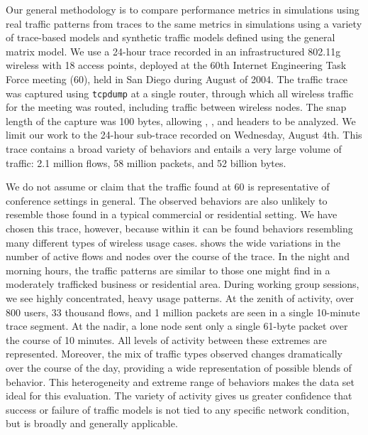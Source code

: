 \documentclass[twocolumn,final]{svjour3}
\begin{document}
Our general methodology is to compare performance metrics in simulations using real traffic patterns from traces to the same metrics in simulations using a variety of trace-based models and synthetic traffic models defined using the general matrix model. We use a 24-hour trace recorded in an infrastructured 802.11g wireless  with 18 access points, deployed at the 60th Internet Engineering Task Force meeting (60), held in San Diego during August of 2004. The traffic trace was captured using \texttt{\small{tcpdump}} at a single router, through which all wireless traffic for the meeting was routed, including traffic between wireless nodes. The snap length of the capture was 100 bytes, allowing , ,  and  headers to be analyzed. We limit our work to the 24-hour sub-trace recorded on Wednesday, August 4th. This trace contains a broad variety of behaviors and entails a very large volume of traffic: 2.1 million flows, 58 million packets, and 52 billion bytes.



We do not assume or claim that the traffic found at 60 is representative of conference settings in general. The observed behaviors are also unlikely to resemble those found in a typical commercial or residential setting. We have chosen this trace, however, because within it can be found behaviors resembling many different types of wireless usage cases.  shows the wide variations in the number of active flows and nodes over the course of the trace. In the night and morning hours, the traffic patterns are similar to those one might find in a moderately trafficked business or residential area. During working group sessions, we see highly concentrated, heavy usage patterns. At the zenith of activity, over 800 users, 33 thousand flows, and 1 million packets are seen in a single 10-minute trace segment. At the nadir, a lone node sent only a single 61-byte packet over the course of 10 minutes. All levels of activity between these extremes are represented. Moreover, the mix of traffic types observed changes dramatically over the course of the day, providing a wide representation of possible blends of behavior. This heterogeneity and extreme range of behaviors makes the  data set ideal for this evaluation. The variety of activity gives us greater confidence that success or failure of traffic models is not tied to any specific network condition, but is broadly and generally applicable. %
\end{document}
